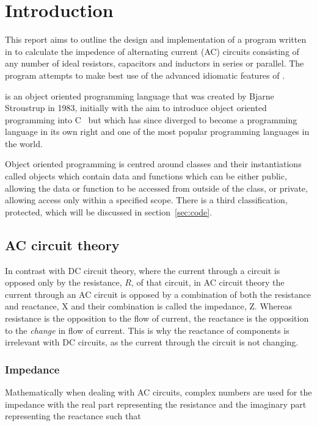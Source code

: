\section{Introduction}
\label{sec:introduction}
This report aims to outline the design and implementation of a program written in \CC{} to calculate the impedence of alternating current (AC) circuits consisting of any number of ideal resistors, capacitors and inductors in series or parallel. The program attempts to make best use of the advanced idiomatic features of \CC.

\CC{} is an object oriented programming language that was created by Bjarne Stroustrup in 1983, initially with the aim to introduce object oriented programming into C~\cite{Stroustrup:2000:CPL:518791} but which has since diverged to become a programming language in its own right and one of the most popular programming languages in the world.

Object oriented programming is centred around classes and their instantiations called objects which contain data and functions which can be either public, allowing the data or function to be accessed from outside of the class, or private, allowing access only within a specified scope. There is a third classification, protected, which will be discussed in section~\ref{sec:code}.

\subsection{AC circuit theory}
\label{sec:theory}
In contrast with DC circuit theory, where the current through a circuit is opposed only by the resistance, $R$, of that circuit, in AC circuit theory the current through an AC circuit is opposed by a combination of both the resistance and reactance, X and their combination is called the impedance, Z. Whereas resistance is the opposition to the flow of current, the reactance is the opposition to the \textit{change} in flow of current. This is why the reactance of components is irrelevant with DC circuits, as the current through the circuit is not changing.

\subsubsection*{Impedance}

Mathematically when dealing with AC circuits, complex numbers are used for the impedance with the real part representing the resistance and the imaginary part representing the reactance such that

